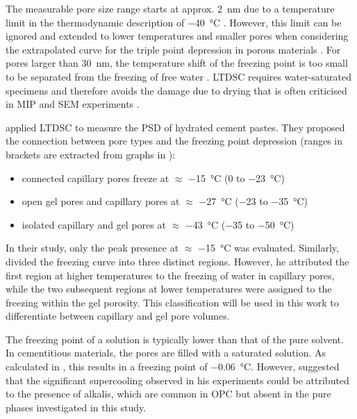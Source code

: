 The measurable pore size range starts at approx. \qty{2}{\nano\meter} \cite{cuperus.1992} due to a temperature limit in the thermodynamic description of \qty{-40}{\celsius} \cite{brun.1977}.
However, this limit can be ignored and extended to lower temperatures and smaller pores when considering the extrapolated curve for the triple point depression in porous materials \cite{kloetstra.1995}.
For pores larger than \qty{30}{\nano\meter}, the temperature shift of the freezing point is too small to be separated from the freezing of free water \cite{cuperus.1992,stocker.2002}.
\ac{LTDSC} requires water-saturated specimens and therefore avoids the damage due to drying \cite{gran.1997,galle.2001} that is often criticised in \ac{MIP} and \ac{SEM} experiments \cite{chatterji.2001,georget.2024}.

\textcite{sant.2011} applied \ac{LTDSC} to measure the \ac{PSD} of hydrated cement pastes.
They proposed the connection between pore types and the freezing point depression (ranges in brackets are extracted from graphs in \cite{sant.2011}):
\begin{itemize}
	\item connected capillary pores freeze at $\approx$ \qty{-15}{\celsius} (\num{0} to \qty{-23}{\celsius})
	\item open gel pores and capillary pores at $\approx$ \qty{-27}{\celsius} (\num{-23} to \qty{-35}{\celsius})
	\item isolated capillary and gel pores at $\approx$ \qty{-43}{\celsius} (\num{-35} to \qty{-50}{\celsius})
\end{itemize}
In their study, only the peak presence at $\approx$ \qty{-15}{\celsius} was evaluated.
Similarly, \textcite{liebrecht.2006} divided the freezing curve into three distinct regions.
However, he attributed the first region at higher temperatures to the freezing of water in capillary pores, while the two subsequent regions at lower temperatures were assigned to the freezing within the gel porosity.
This classification will be used in this work to differentiate between capillary and gel pore volumes.

The freezing point of a solution is typically lower than that of the pure solvent.
In cementitious materials, the pores are filled with a saturated  solution.
As calculated in , this results in a freezing point of \qty{-0.06}{\celsius}.
However, \textcite{liebrecht.2006} suggested that the significant supercooling observed in his experiments could be attributed to the presence of alkalis, which are common in \ac{OPC} but absent in the pure phases investigated in this study.

